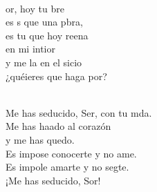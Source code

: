 \documentclass[12pt]{article}
\begin{document}
\begin{multicols*}{2}
\begin{cancion}
\begin{chorus}
	\end{chorus}%
	\jump\\
	or, hoy tu bre  \\
	es s que una pbra, \\
	es tu  que hoy reena \\
	en mi intior \\
	y me la en el sicio\\
	¿quéieres que haga por? \\\jump\\
	\begin{chorus}%
	Me has seducido, Ser, con tu mda.\\
	Me has haado al corazón \\
	y me has quedo.\\
	Es impose conocerte y no ame.\\
	Es impole amarte y no segte.\\
	¡Me has seducido, Sor!\\
	\end{chorus}%
	\jump\\
\end{cancion}%


\end{multicols*}
\end{document}
